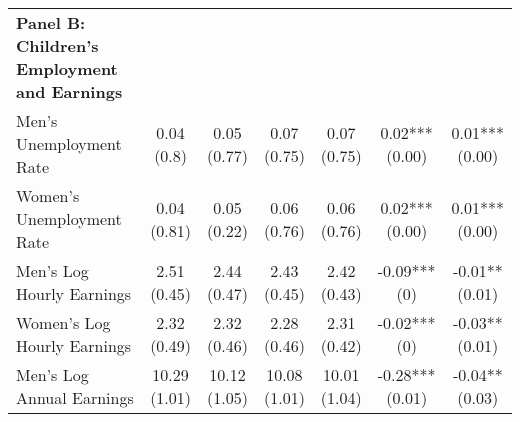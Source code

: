 \begin{landscape}
\begin{ThreePartTable}
\begin{longtable}[t]{>{\raggedright\arraybackslash}p{5cm}cccccc}
\textbf{Panel B: Children's Employment and Earnings} & \textbf{} & \textbf{} & \textbf{} & \textbf{} & \textbf{} & \textbf{}\\
\hspace{1em}Men’s Unemployment Rate & \specialcell{0.04\\(0.8)} & \specialcell{0.05\\(0.77)} & \specialcell{0.07\\(0.75)} & \specialcell{0.07\\(0.75)} & \specialcell{0.02***\\(0.00)} & \specialcell{0.01***\\(0.00)}\\
\hspace{1em}Women’s Unemployment Rate & \specialcell{0.04\\(0.81)} & \specialcell{0.05\\(0.22)} & \specialcell{0.06\\(0.76)} & \specialcell{0.06\\(0.76)} & \specialcell{0.02***\\(0.00)} & \specialcell{0.01***\\(0.00)}\\
\hspace{1em}Men’s Log Hourly Earnings & \specialcell{2.51\\(0.45)} & \specialcell{2.44\\(0.47)} & \specialcell{2.43\\(0.45)} & \specialcell{2.42\\(0.43)} & \specialcell{-0.09***\\(0)} & \specialcell{-0.01**\\(0.01)}\\
\addlinespace
\hspace{1em}Women’s Log Hourly Earnings & \specialcell{2.32\\(0.49)} & \specialcell{2.32\\(0.46)} & \specialcell{2.28\\(0.46)} & \specialcell{2.31\\(0.42)} & \specialcell{-0.02***\\(0)} & \specialcell{-0.03**\\(0.01)}\\
\hspace{1em}Men’s Log Annual Earnings & \specialcell{10.29\\(1.01)} & \specialcell{10.12\\(1.05)} & \specialcell{10.08\\(1.01)} & \specialcell{10.01\\(1.04)} & \specialcell{-0.28***\\(0.01)} & \specialcell{-0.04**\\(0.03)}\\

\end{longtable}
\end{ThreePartTable}
\end{landscape}
